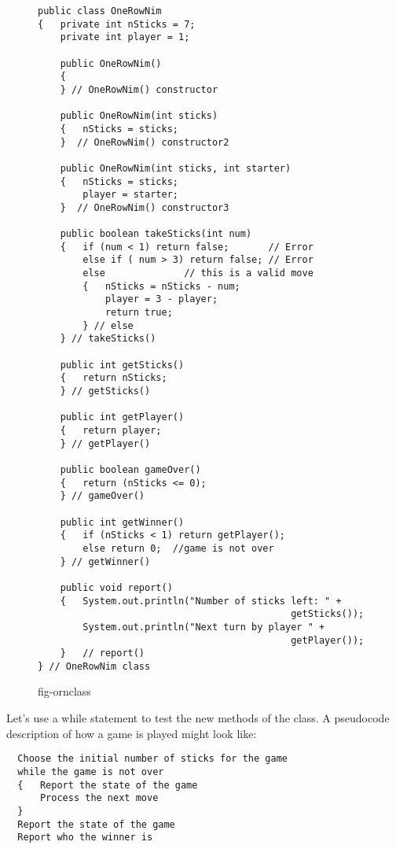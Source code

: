\begin{figure}[p]
\jjjprogstart
\begin{jjjlisting}
\begin{lstlisting}
public class OneRowNim 
{   private int nSticks = 7;
    private int player = 1;

    public OneRowNim() 
    {
    } // OneRowNim() constructor

    public OneRowNim(int sticks) 
    {   nSticks = sticks;
    }  // OneRowNim() constructor2

    public OneRowNim(int sticks, int starter) 
    {   nSticks = sticks;
        player = starter;
    }  // OneRowNim() constructor3

    public boolean takeSticks(int num) 
    {   if (num < 1) return false;       // Error
        else if ( num > 3) return false; // Error
        else              // this is a valid move
        {   nSticks = nSticks - num;
            player = 3 - player;
            return true;
        } // else
    } // takeSticks()

    public int getSticks() 
    {   return nSticks;
    } // getSticks()

    public int getPlayer() 
    {   return player;
    } // getPlayer()

    public boolean gameOver()
    {   return (nSticks <= 0);
    } // gameOver()

    public int getWinner()
    {   if (nSticks < 1) return getPlayer();
        else return 0;  //game is not over
    } // getWinner()
    
    public void report()
    {   System.out.println("Number of sticks left: " + 
                                             getSticks());
        System.out.println("Next turn by player " + 
                                             getPlayer());
    }   // report()
} // OneRowNim class
\end{lstlisting}
\end{jjjlisting}
{fig-ornclass}
\end{figure}

Let's use a while statement to test the new methods of the class.  A
pseudocode description of how a game is played might look like:

\begin{jjjlisting}
\begin{lstlisting}
  Choose the initial number of sticks for the game
  while the game is not over
  {   Report the state of the game
      Process the next move
  }
  Report the state of the game
  Report who the winner is
\end{lstlisting}
\end{jjjlisting}

